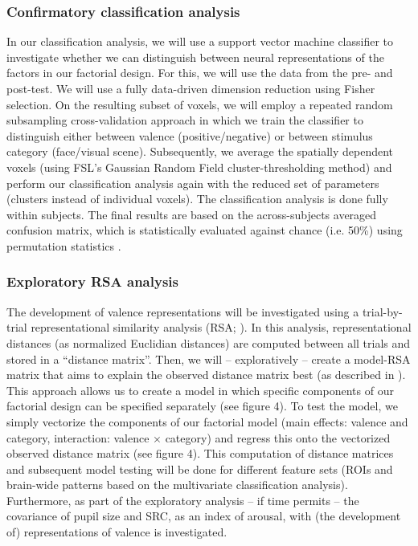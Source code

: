 \documentclass[12pt,a4paper]{article}\usepackage[]{graphicx}\usepackage[]{color}
\begin{document}
\subsubsection{Confirmatory classification analysis}
In our classification analysis, we will use a support vector machine classifier to investigate whether we can distinguish between neural representations of the factors in our factorial design. For this, we will use the data from the pre- and post-test. We will use a fully data-driven dimension reduction using Fisher selection. On the resulting subset of voxels, we will employ a repeated random subsampling cross-validation approach in which we train the classifier to distinguish either between valence (positive/negative) or between stimulus category (face/visual scene). Subsequently, we average the spatially dependent voxels (using FSL's Gaussian Random Field cluster-thresholding method) and perform our classification analysis again with the reduced set of parameters (clusters instead of individual voxels). The classification analysis is done fully within subjects. The final results are based on the across-subjects averaged confusion matrix, which is statistically evaluated against chance (i.e. 50\%) using permutation statistics \citep{nichols2002}.     

\subsubsection{Exploratory RSA analysis}
The development of valence representations will be investigated using a trial-by-trial representational similarity analysis (RSA; \citealp{kriegeskorte2008}). In this analysis, representational distances (as normalized Euclidian distances) are computed between all trials and stored in a ``distance matrix''. Then, we will -- exploratively -- create a model-RSA matrix that aims to explain the observed distance matrix best (as described in \citealp{walther2015}). This approach allows us to create a model in which specific components of our factorial design can be specified separately (see figure 4). To test the model, we simply vectorize the components of our factorial model (main effects: valence and category, interaction: valence $\times$ category) and regress this onto the vectorized observed distance matrix (see figure 4). This computation of distance matrices and subsequent model testing will be done for different feature sets (ROIs and brain-wide patterns based on the multivariate classification analysis). Furthermore, as part of the exploratory analysis -- if time permits -- the covariance of pupil size and SRC, as an index of arousal, with (the development of) representations of valence is investigated.
\end{document}
